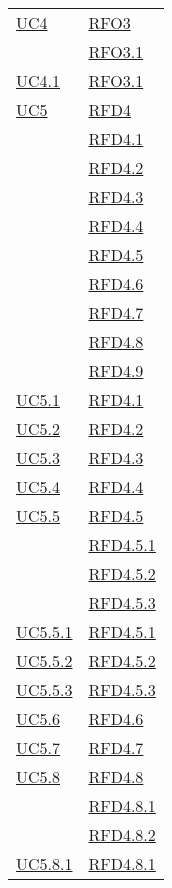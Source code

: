 \begin{longtable}{|>{\centering}m{5cm}|m{5cm}<{\centering}|}
\hyperref[UC4]{UC4} & \hyperlink{RFO3}{RFO3}\\
& \hyperlink{RFO3.1}{RFO3.1}\\ \hline
\hyperref[UC4.1]{UC4.1} & \hyperlink{RFO3.1}{RFO3.1}\\ \hline
\hyperref[UC5]{UC5} & \hyperlink{RFD4}{RFD4}\\
& \hyperlink{RFD4.1}{RFD4.1}\\
& \hyperlink{RFD4.2}{RFD4.2}\\
& \hyperlink{RFD4.3}{RFD4.3}\\
& \hyperlink{RFD4.4}{RFD4.4}\\
& \hyperlink{RFD4.5}{RFD4.5}\\
& \hyperlink{RFD4.6}{RFD4.6}\\
& \hyperlink{RFD4.7}{RFD4.7}\\
& \hyperlink{RFD4.8}{RFD4.8}\\
& \hyperlink{RFD4.9}{RFD4.9}\\ \hline
\hyperref[UC5.1]{UC5.1} & \hyperlink{RFD4.1}{RFD4.1}\\ \hline
\hyperref[UC5.2]{UC5.2} & \hyperlink{RFD4.2}{RFD4.2}\\ \hline
\hyperref[UC5.3]{UC5.3} & \hyperlink{RFD4.3}{RFD4.3}\\ \hline
\hyperref[UC5.4]{UC5.4} & \hyperlink{RFD4.4}{RFD4.4}\\ \hline
\hyperref[UC5.5]{UC5.5} & \hyperlink{RFD4.5}{RFD4.5}\\
& \hyperlink{RFD4.5.1}{RFD4.5.1}\\
& \hyperlink{RFD4.5.2}{RFD4.5.2}\\
& \hyperlink{RFD4.5.3}{RFD4.5.3}\\ \hline
\hyperref[UC5.5.1]{UC5.5.1} & \hyperlink{RFD4.5.1}{RFD4.5.1}\\ \hline
\hyperref[UC5.5.2]{UC5.5.2} & \hyperlink{RFD4.5.2}{RFD4.5.2}\\ \hline
\hyperref[UC5.5.3]{UC5.5.3} & \hyperlink{RFD4.5.3}{RFD4.5.3}\\ \hline
\hyperref[UC5.6]{UC5.6} & \hyperlink{RFD4.6}{RFD4.6}\\ \hline
\hyperref[UC5.7]{UC5.7} & \hyperlink{RFD4.7}{RFD4.7}\\ \hline
\hyperref[UC5.8]{UC5.8} & \hyperlink{RFD4.8}{RFD4.8}\\
& \hyperlink{RFD4.8.1}{RFD4.8.1}\\
& \hyperlink{RFD4.8.2}{RFD4.8.2}\\ \hline
\hyperref[UC5.8.1]{UC5.8.1} & \hyperlink{RFD4.8.1}{RFD4.8.1}\\ \hline

\end{longtable}
